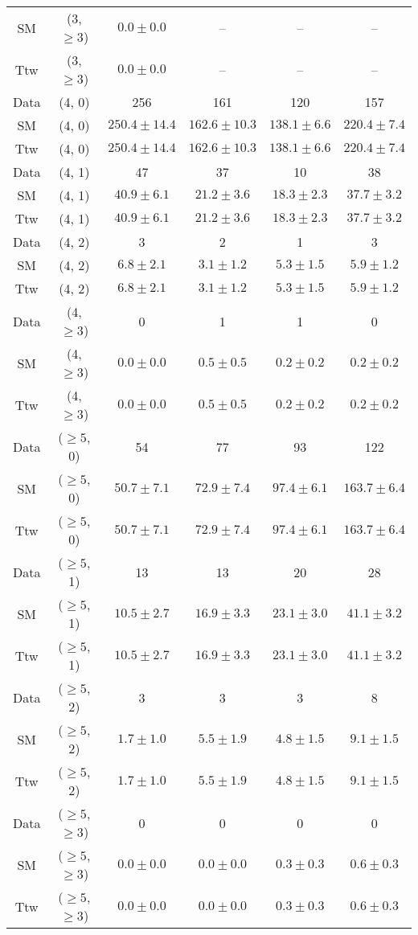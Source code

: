 \begin{table}[h!]
{\begin{tabular}{cccccc}
	SM & (3, $\ge3$) & $0.0\pm 0.0$ & -- & -- & -- \\[0.5ex] 
	Ttw & (3, $\ge3$) & $0.0\pm 0.0$ & -- & -- & -- \\[0.5ex] 
	Data & (4, 0) & 256 & 161 & 120 & 157 \\[0.5ex] 
	SM & (4, 0) & $250.4\pm 14.4$ & $162.6\pm 10.3$ & $138.1\pm 6.6$ & $220.4\pm 7.4$ \\[0.5ex] 
	Ttw & (4, 0) & $250.4\pm 14.4$ & $162.6\pm 10.3$ & $138.1\pm 6.6$ & $220.4\pm 7.4$ \\[0.5ex] 
	Data & (4, 1) & 47 & 37 & 10 & 38 \\[0.5ex] 
	SM & (4, 1) & $40.9\pm 6.1$ & $21.2\pm 3.6$ & $18.3\pm 2.3$ & $37.7\pm 3.2$ \\[0.5ex] 
	Ttw & (4, 1) & $40.9\pm 6.1$ & $21.2\pm 3.6$ & $18.3\pm 2.3$ & $37.7\pm 3.2$ \\[0.5ex] 
	Data & (4, 2) & 3 & 2 & 1 & 3 \\[0.5ex] 
	SM & (4, 2) & $6.8\pm 2.1$ & $3.1\pm 1.2$ & $5.3\pm 1.5$ & $5.9\pm 1.2$ \\[0.5ex] 
	Ttw & (4, 2) & $6.8\pm 2.1$ & $3.1\pm 1.2$ & $5.3\pm 1.5$ & $5.9\pm 1.2$ \\[0.5ex] 
	Data & (4, $\ge3$) & 0 & 1 & 1 & 0 \\[0.5ex] 
	SM & (4, $\ge3$) & $0.0\pm 0.0$ & $0.5\pm 0.5$ & $0.2\pm 0.2$ & $0.2\pm 0.2$ \\[0.5ex] 
	Ttw & (4, $\ge3$) & $0.0\pm 0.0$ & $0.5\pm 0.5$ & $0.2\pm 0.2$ & $0.2\pm 0.2$ \\[0.5ex] 
	Data & ($\ge5$, 0) & 54 & 77 & 93 & 122 \\[0.5ex] 
	SM & ($\ge5$, 0) & $50.7\pm 7.1$ & $72.9\pm 7.4$ & $97.4\pm 6.1$ & $163.7\pm 6.4$ \\[0.5ex] 
	Ttw & ($\ge5$, 0) & $50.7\pm 7.1$ & $72.9\pm 7.4$ & $97.4\pm 6.1$ & $163.7\pm 6.4$ \\[0.5ex] 
	Data & ($\ge5$, 1) & 13 & 13 & 20 & 28 \\[0.5ex] 
	SM & ($\ge5$, 1) & $10.5\pm 2.7$ & $16.9\pm 3.3$ & $23.1\pm 3.0$ & $41.1\pm 3.2$ \\[0.5ex] 
	Ttw & ($\ge5$, 1) & $10.5\pm 2.7$ & $16.9\pm 3.3$ & $23.1\pm 3.0$ & $41.1\pm 3.2$ \\[0.5ex] 
	Data & ($\ge5$, 2) & 3 & 3 & 3 & 8 \\[0.5ex] 
	SM & ($\ge5$, 2) & $1.7\pm 1.0$ & $5.5\pm 1.9$ & $4.8\pm 1.5$ & $9.1\pm 1.5$ \\[0.5ex] 
	Ttw & ($\ge5$, 2) & $1.7\pm 1.0$ & $5.5\pm 1.9$ & $4.8\pm 1.5$ & $9.1\pm 1.5$ \\[0.5ex] 
	Data & ($\ge5$, $\ge3$) & 0 & 0 & 0 & 0 \\[0.5ex] 
	SM & ($\ge5$, $\ge3$) & $0.0\pm 0.0$ & $0.0\pm 0.0$ & $0.3\pm 0.3$ & $0.6\pm 0.3$ \\[0.5ex] 
	Ttw & ($\ge5$, $\ge3$) & $0.0\pm 0.0$ & $0.0\pm 0.0$ & $0.3\pm 0.3$ & $0.6\pm 0.3$ \\[0.5ex] 
	\hline
	\hline
\end{tabular}}
\end{table}
